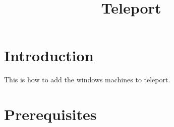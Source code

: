 \documentclass{article}
\title{Teleport}
\begin{document}
\maketitle

\graphicspath{ {./Images/} }
\tableofcontents

\section{Introduction}
This is how to add the windows machines to teleport.

\section{Prerequisites}
\end{document}
